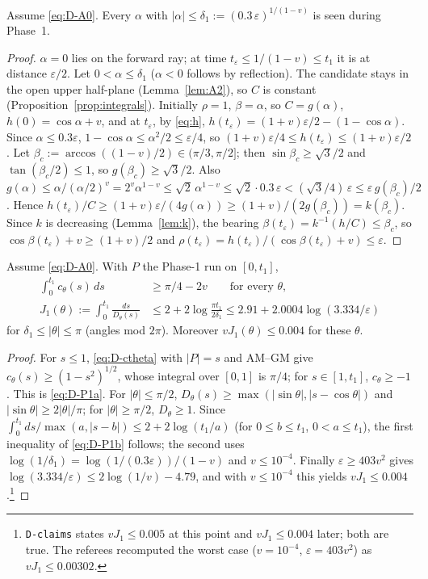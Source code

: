 \begin{lemma}\label{lem:D-tip}
Assume \eqref{eq:D-A0}. Every $\alpha$ with $|\alpha|\le\delta_1:=(0.3\,\varepsilon)^{1/(1-v)}$ is seen during Phase~1.
\end{lemma}
\begin{proof}
$\alpha=0$ lies on the forward ray; at time $t_\varepsilon\le1/(1-v)\le t_1$ it is at distance $\varepsilon/2$. Let
$0<\alpha\le\delta_1$ ($\alpha<0$ follows by reflection). The candidate stays in the open upper half-plane
(Lemma~\ref{lem:A2}), so $C$ is constant (Proposition~\ref{prop:integrals}). Initially $\rho=1$, $\beta=\alpha$, so
$C=g(\alpha)$, $h(0)=\cos\alpha+v$, and at $t_\varepsilon$, by \eqref{eq:h},
$h(t_\varepsilon)=(1+v)\varepsilon/2-(1-\cos\alpha)$. Since $\alpha\le0.3\varepsilon$, $1-\cos\alpha\le\alpha^2/2\le\varepsilon/4$, so
$(1+v)\varepsilon/4\le h(t_\varepsilon)\le(1+v)\varepsilon/2$.
Let $\beta_c:=\arccos((1-v)/2)\in(\pi/3,\pi/2]$; then $\sin\beta_c\ge\sqrt3/2$ and $\tan(\beta_c/2)\le1$, so
$g(\beta_c)\ge\sqrt3/2$. Also
$g(\alpha)\le\alpha/(\alpha/2)^v=2^v\alpha^{1-v}\le\sqrt2\,\alpha^{1-v}\le\sqrt2\cdot0.3\,\varepsilon<(\sqrt3/4)\,\varepsilon\le\varepsilon\,g(\beta_c)/2$.
Hence $h(t_\varepsilon)/C\ge(1+v)\varepsilon/(4g(\alpha))\ge(1+v)/(2g(\beta_c))=k(\beta_c)$. Since $k$ is decreasing
(Lemma~\ref{lem:k}), the bearing $\beta(t_\varepsilon)=k^{-1}(h/C)\le\beta_c$, so $\cos\beta(t_\varepsilon)+v\ge(1+v)/2$ and
$\rho(t_\varepsilon)=h(t_\varepsilon)/(\cos\beta(t_\varepsilon)+v)\le\varepsilon$.
\end{proof}

\begin{lemma}\label{lem:D-P1}
Assume \eqref{eq:D-A0}. With $P$ the Phase-1 run on $[0,t_1]$,
\begin{align}
\int_0^{t_1}c_\theta(s)\,ds&\ge\pi/4-2v\qquad\text{for every }\theta, \label{eq:D-P1a}\tag{P1a}\\
J_1(\theta):=\int_0^{t_1}\frac{ds}{D_\theta(s)}&\le2+2\log\frac{\pi t_1}{2\delta_1}\le2.91+2.0004\log(3.334/\varepsilon)
\label{eq:D-P1b}\tag{P1b}
\end{align}
for $\delta_1\le|\theta|\le\pi$ (angles mod $2\pi$). Moreover $vJ_1(\theta)\le0.004$ for these $\theta$.
\end{lemma}
\begin{proof}
For $s\le1$, \eqref{eq:D-ctheta} with $|P|=s$ and AM--GM give $c_\theta(s)\ge(1-s^2)^{1/2}$, whose integral over $[0,1]$ is
$\pi/4$; for $s\in[1,t_1]$, $c_\theta\ge-1$. This is \eqref{eq:D-P1a}.
For $|\theta|\le\pi/2$, $D_\theta(s)\ge\max(|\sin\theta|,|s-\cos\theta|)$ and $|\sin\theta|\ge2|\theta|/\pi$; for
$|\theta|\ge\pi/2$, $D_\theta\ge1$. Since $\int_0^{t_1}ds/\max(a,|s-b|)\le2+2\log(t_1/a)$ (for $0\le b\le t_1$, $0<a\le t_1$),
the first inequality of \eqref{eq:D-P1b} follows; the second uses $\log(1/\delta_1)=\log(1/(0.3\varepsilon))/(1-v)$ and
$v\le10^{-4}$. Finally $\varepsilon\ge403v^2$ gives $\log(3.334/\varepsilon)\le2\log(1/v)-4.79$, and with $v\le10^{-4}$ this
yields $vJ_1\le0.004$.\footnote{\texttt{D-claims} states $vJ_1\le0.005$ at this point and $vJ_1\le0.004$ later; both are true.
The referees recomputed the worst case ($v=10^{-4}$, $\varepsilon=403v^2$) as $vJ_1\le0.00302$.}
\end{proof}

